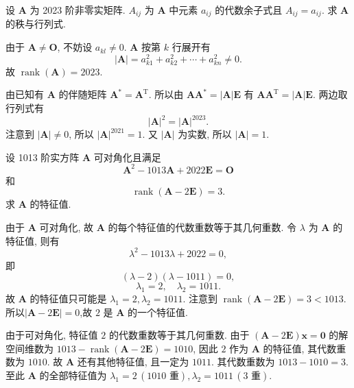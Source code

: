 \documentclass[../../main.tex]{subfiles}
\begin{document}
\begin{example}
设 \(\boldsymbol{A}\) 为 2023 阶非零实矩阵. \(A_{ij}\) 为 \(\boldsymbol{A}\) 中元素 \(a_{ij}\) 的代数余子式且 \(A_{ij} = a_{ij}\). 求 \(\boldsymbol{A}\) 的秩与行列式.
\end{example}
\begin{solution}
由于 \(\boldsymbol{A} \neq \boldsymbol{O}\), 不妨设 \(a_{kl} \neq 0\). \(\boldsymbol{A}\) 按第 \(k\) 行展开有
\[
|\boldsymbol{A}| = a_{k1}^2 + a_{k2}^2 + \cdots + a_{kn}^2 \neq 0.
\]
故 \(\operatorname{rank}(\boldsymbol{A}) = 2023\).

由已知有 \(\boldsymbol{A}\) 的伴随矩阵 \(\boldsymbol{A}^* = \boldsymbol{A}^\mathrm{T}\). 所以由 \(\boldsymbol{A}\boldsymbol{A}^* = |\boldsymbol{A}|\boldsymbol{E}\) 有 \(\boldsymbol{A}\boldsymbol{A}^\mathrm{T} = |\boldsymbol{A}|\boldsymbol{E}\). 两边取行列式有
\[
|\boldsymbol{A}|^2 = |\boldsymbol{A}|^{2023}.
\]
注意到 \(|\boldsymbol{A}| \neq 0\), 所以 \(|\boldsymbol{A}|^{2021} = 1\). 又 \(|\boldsymbol{A}|\) 为实数, 所以 \(|\boldsymbol{A}| = 1\).
\end{solution}

\begin{example}
设 1013 阶实方阵 \(\boldsymbol{A}\) 可对角化且满足
\[
\boldsymbol{A}^2 - 1013\boldsymbol{A} + 2022\boldsymbol{E} = \boldsymbol{O}
\]
和
\[
\operatorname{rank}(\boldsymbol{A} - 2\boldsymbol{E}) = 3.
\]
求 \(\boldsymbol{A}\) 的特征值.
\end{example}
\begin{solution}
由于 \(\boldsymbol{A}\) 可对角化, 故 \(\boldsymbol{A}\) 的每个特征值的代数重数等于其几何重数. 令 \(\lambda\) 为 \(\boldsymbol{A}\) 的特征值, 则有
\[
\lambda^2 - 1013\lambda + 2022 = 0,
\]
即
\[
(\lambda - 2)(\lambda - 1011) = 0,
\]
\[
\lambda_1 = 2, \quad \lambda_2 = 1011.
\]
故 \(\boldsymbol{A}\) 的特征值只可能是 \(\lambda_1 = 2, \lambda_2 = 1011\). 注意到 \(\operatorname{rank}(\boldsymbol{A} - 2\boldsymbol{E}) = 3 < 1013\). 所以$|\boldsymbol{A} - 2\boldsymbol{E}|=0$,故 \(2\) 是 \(\boldsymbol{A}\) 的一个特征值.

由于可对角化, 特征值 \(2\) 的代数重数等于其几何重数. 由于 \((\boldsymbol{A} - 2\boldsymbol{E})\boldsymbol{x} = \boldsymbol{0}\) 的解空间维数为 \(1013 - \operatorname{rank}(\boldsymbol{A} - 2\boldsymbol{E}) = 1010\), 因此 \(2\) 作为 \(\boldsymbol{A}\) 的特征值, 其代数重数为 \(1010\). 故 \(\boldsymbol{A}\) 还有其他特征值, 且一定为 \(1011\). 其代数重数为 \(1013 - 1010 = 3\). 至此 \(\boldsymbol{A}\) 的全部特征值为 \(\lambda_1 = 2 \, (1010 \text{ 重}), \lambda_2 = 1011 \, (3 \text{ 重})\).
\end{solution}
\end{document}
